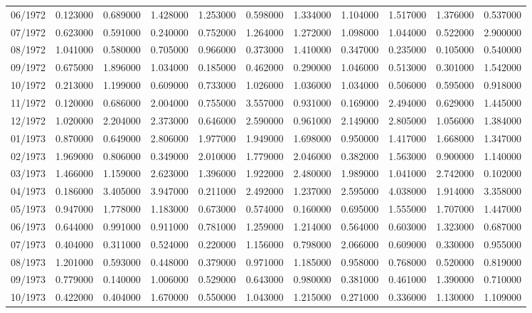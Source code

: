 \begin{tabular}{lrrrrrrrrrr}
06/1972 & 0.123000 & 0.689000 & 1.428000 & 1.253000 & 0.598000 & 1.334000 & 1.104000 & 1.517000 & 1.376000 & 0.537000 \\
07/1972 & 0.623000 & 0.591000 & 0.240000 & 0.752000 & 1.264000 & 1.272000 & 1.098000 & 1.044000 & 0.522000 & 2.900000 \\
08/1972 & 1.041000 & 0.580000 & 0.705000 & 0.966000 & 0.373000 & 1.410000 & 0.347000 & 0.235000 & 0.105000 & 0.540000 \\
09/1972 & 0.675000 & 1.896000 & 1.034000 & 0.185000 & 0.462000 & 0.290000 & 1.046000 & 0.513000 & 0.301000 & 1.542000 \\
10/1972 & 0.213000 & 1.199000 & 0.609000 & 0.733000 & 1.026000 & 1.036000 & 1.034000 & 0.506000 & 0.595000 & 0.918000 \\
11/1972 & 0.120000 & 0.686000 & 2.004000 & 0.755000 & 3.557000 & 0.931000 & 0.169000 & 2.494000 & 0.629000 & 1.445000 \\
12/1972 & 1.020000 & 2.204000 & 2.373000 & 0.646000 & 2.590000 & 0.961000 & 2.149000 & 2.805000 & 1.056000 & 1.384000 \\
01/1973 & 0.870000 & 0.649000 & 2.806000 & 1.977000 & 1.949000 & 1.698000 & 0.950000 & 1.417000 & 1.668000 & 1.347000 \\
02/1973 & 1.969000 & 0.806000 & 0.349000 & 2.010000 & 1.779000 & 2.046000 & 0.382000 & 1.563000 & 0.900000 & 1.140000 \\
03/1973 & 1.466000 & 1.159000 & 2.623000 & 1.396000 & 1.922000 & 2.480000 & 1.989000 & 1.041000 & 2.742000 & 0.102000 \\
04/1973 & 0.186000 & 3.405000 & 3.947000 & 0.211000 & 2.492000 & 1.237000 & 2.595000 & 4.038000 & 1.914000 & 3.358000 \\
05/1973 & 0.947000 & 1.778000 & 1.183000 & 0.673000 & 0.574000 & 0.160000 & 0.695000 & 1.555000 & 1.707000 & 1.447000 \\
06/1973 & 0.644000 & 0.991000 & 0.911000 & 0.781000 & 1.259000 & 1.214000 & 0.564000 & 0.603000 & 1.323000 & 0.687000 \\
07/1973 & 0.404000 & 0.311000 & 0.524000 & 0.220000 & 1.156000 & 0.798000 & 2.066000 & 0.609000 & 0.330000 & 0.955000 \\
08/1973 & 1.201000 & 0.593000 & 0.448000 & 0.379000 & 0.971000 & 1.185000 & 0.958000 & 0.768000 & 0.520000 & 0.819000 \\
09/1973 & 0.779000 & 0.140000 & 1.006000 & 0.529000 & 0.643000 & 0.980000 & 0.381000 & 0.461000 & 1.390000 & 0.710000 \\
10/1973 & 0.422000 & 0.404000 & 1.670000 & 0.550000 & 1.043000 & 1.215000 & 0.271000 & 0.336000 & 1.130000 & 1.109000 \\

\end{tabular}
